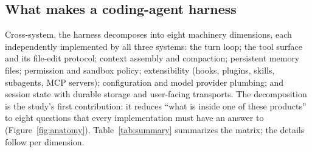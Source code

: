 \documentclass{article}
\begin{document}
\subsection{What makes a coding-agent harness}
\label{sec:components}

Cross-system, the harness decomposes into eight machinery dimensions, each
independently implemented by all three systems: the turn loop; the tool
surface and its file-edit protocol; context assembly and compaction;
persistent memory files; permission and sandbox policy; extensibility
(hooks, plugins, skills, subagents, MCP servers); configuration and model
provider plumbing; and session state with durable storage and user-facing
transports. The decomposition is the study's first contribution: it
reduces ``what is inside one of these products'' to eight questions that
every implementation must have an answer to (Figure~\ref{fig:anatomy}).
Table~\ref{tab:summary} summarizes the matrix; the details follow per
dimension.
\end{document}
